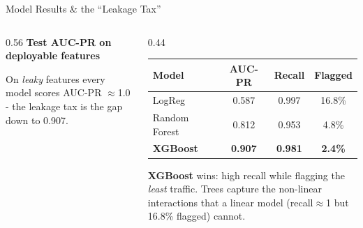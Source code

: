 \documentclass[t, aspectratio=169]{beamer} %
\newcommand{\winrow}{\rowcolor{hustprimary!16}}
\begin{document}
\useStyleLogoOnly
\begin{frame}{Model Results \& the ``Leakage Tax''}
	\begin{columns}[T]
		\begin{column}{0.56\textwidth}
			\centering
			\footnotesize
			\textbf{Test AUC-PR on deployable features}\\[3pt]
			\vspace{0.2em}

			{\scriptsize On \emph{leaky} features every model scores AUC-PR
			$\approx$1.0 - the \alert{leakage tax} is the gap down to 0.907.}
		\end{column}
		\begin{column}{0.44\textwidth}
			\scriptsize
			\setlength{\tabcolsep}{3.2pt}
			\begin{tabular}{l c c c}
				\toprule
				\textbf{Model} & \textbf{AUC-PR} & \textbf{Recall} & \textbf{Flagged} \\
				\midrule
				LogReg        & 0.587 & 0.997 & 16.8\% \\
				Random Forest & 0.812 & 0.953 & 4.8\% \\
				\winrow \textbf{XGBoost} & \textbf{0.907} & \textbf{0.981} & \textbf{2.4\%} \\
				\bottomrule
			\end{tabular}
			\vspace{0.5em}

			\textbf{XGBoost} wins: high recall while flagging the \emph{least}
			traffic. Trees capture the non-linear interactions that a linear
			model (recall$\approx$1 but 16.8\% flagged) cannot.
		\end{column}
	\end{columns}
\end{frame}
\useStyleFull
\end{document}
